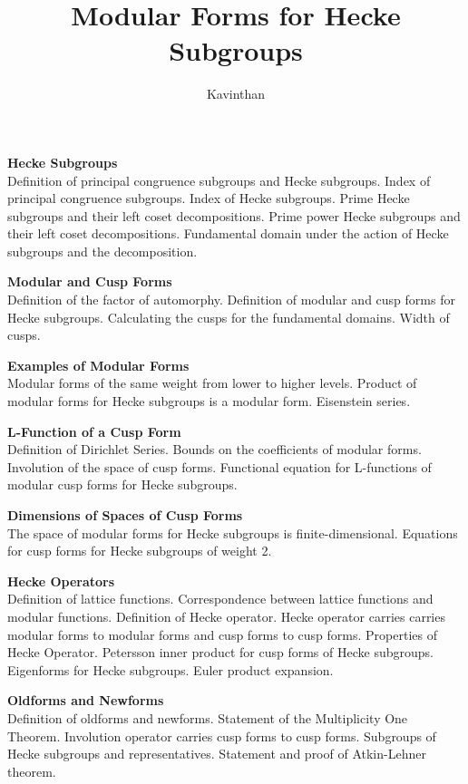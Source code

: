\documentclass[a4paper]{article}
\title{Modular Forms for Hecke Subgroups}
\author{Kavinthan}
\begin{document}
\maketitle
{\small
\noindent\textbf{Hecke Subgroups}\\
Definition of principal congruence subgroups and Hecke subgroups. Index of principal congruence subgroups. Index of Hecke subgroups. Prime Hecke subgroups and their left coset decompositions. Prime power Hecke subgroups and their left coset decompositions. Fundamental domain under the action of Hecke subgroups and the decomposition.\hspace*{\fill}

\vspace{10pt}
\noindent\textbf{Modular and Cusp Forms}\\
Definition of the factor of automorphy. Definition of modular and cusp forms for Hecke subgroups. Calculating the cusps for the fundamental domains. Width of cusps.\hspace*{\fill}

\vspace{10pt}
\noindent\textbf{Examples of Modular Forms}\\
Modular forms of the same weight from lower to higher levels. Product of modular forms for Hecke subgroups is a modular form. Eisenstein series.\hspace*{\fill}

\vspace{10pt}
\noindent\textbf{L-Function of a Cusp Form}\\
Definition of Dirichlet Series. Bounds on the coefficients of modular forms. Involution of the space of cusp forms. Functional equation for L-functions of modular cusp forms for Hecke subgroups.\hspace*{\fill}

\vspace{10pt}
\noindent\textbf{Dimensions of Spaces of Cusp Forms}\\
The space of modular forms for Hecke subgroups is finite-dimensional. Equations for cusp forms for Hecke subgroups of weight 2.\hspace*{\fill}

\vspace{10pt}
\noindent\textbf{Hecke Operators}\\
Definition of lattice functions. Correspondence between lattice functions and modular functions. Definition of Hecke operator. Hecke operator carries carries modular forms to modular forms and cusp forms to cusp forms. Properties of Hecke Operator. Petersson inner product for cusp forms of Hecke subgroups. Eigenforms for Hecke subgroups. Euler product expansion.\hspace*{\fill}

\vspace{10pt}
\noindent\textbf{Oldforms and Newforms}\\
Definition of oldforms and newforms. Statement of the Multiplicity One Theorem. Involution operator carries cusp forms to cusp forms. Subgroups of Hecke subgroups and representatives. Statement and proof of Atkin-Lehner theorem. \hspace*{\fill}}
\tableofcontents
\end{document}
